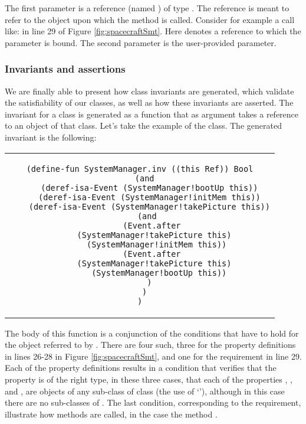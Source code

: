 The first parameter is a reference (named )
of type . The  reference is meant to 
refer to the object upon which the method is called. Consider for example a call like:  in line 29 of Figure
\ref{fig:spacecraftSmt}. Here  denotes a reference to which the parameter  is bound.
The second parameter is the user-provided parameter.

\subsubsection{Invariants and assertions}

We are finally able to present how class invariants are generated, 
which validate the satisfiability of our classes, as well as how 
these invariants are asserted. The invariant for a class is
generated as a function that as argument takes a 
reference to an object of that class. Let's take the example of the
 class. The generated invariant is the 
following:

\begin{center}
\begin{tabular}{c}
\begin{lstlisting}
(define-fun SystemManager.inv ((this Ref)) Bool
  (and
    (deref-isa-Event (SystemManager!bootUp this))
    (deref-isa-Event (SystemManager!initMem this))
    (deref-isa-Event (SystemManager!takePicture this))
    (and 
      (Event.after 
        (SystemManager!takePicture this)  
        (SystemManager!initMem this)) 
      (Event.after 
        (SystemManager!takePicture this)  
        (SystemManager!bootUp this))
    )
  )
)
\end{lstlisting}
\end{tabular}
\end{center}

The body of this function is a conjunction of the conditions
that have to hold for the  object referred to
by . There are four such, three for the property
definitions in lines 26-28 in Figure \ref{fig:spacecraftSmt},
and one for the requirement in line 29. Each of the property definitions results in a condition that verifies that the property
is of the right type, in these three cases, that each of the properties \code{}, \code{}, and \code{}, are objects of any sub-class of class  (the use of `'), although
in this case there are no sub-classes of . The last condition, corresponding to the requirement, illustrate how
methods are called, in the case the method .

